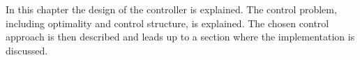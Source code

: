 \vspace{-6mm}
In this chapter the design of the controller is explained. The control problem, including optimality and control structure, is explained. The chosen control approach is then described and leads up to a section where the implementation is discussed. 
\vspace{-4mm}
%
%
%